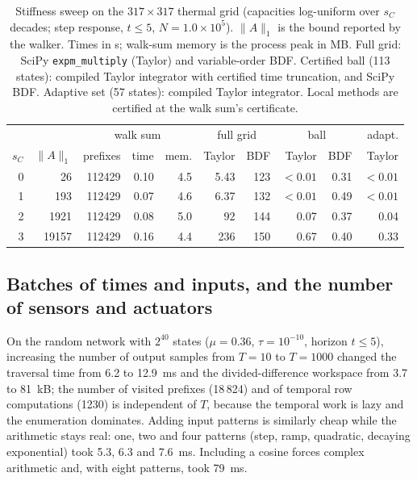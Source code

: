 \documentclass[aps,pra,superscriptaddress,floatfix,longbibliography,twocolumn]{revtex4-2}
\begin{document}
\begin{table}[t]
\footnotesize\setlength{\tabcolsep}{1.8pt}
\caption{Stiffness sweep on the $317\times317$ thermal grid (capacities log-uniform over $s_C$ decades; step response, $t\le5$, $N=1.0\times10^5$). $\|A\|_1$ is the bound reported by the walker. Times in s; walk-sum memory is the process peak in MB. Full grid: SciPy \texttt{expm\_multiply} (Taylor) and variable-order BDF. Certified ball (113 states): compiled Taylor integrator with certified time truncation, and SciPy BDF. Adaptive set (57 states): compiled Taylor integrator. Local methods are certified at the walk sum's certificate.}\label{tab:stiff}
\begin{ruledtabular}
\begin{tabular}{rr|rrr|rr|rr|r}
 & & \multicolumn{3}{c|}{walk sum} & \multicolumn{2}{c|}{full grid} & \multicolumn{2}{c|}{ball} & adapt.\\
$s_C$ & $\|A\|_1$ & prefixes & time & mem. & Taylor & BDF & Taylor & BDF & Taylor\\\hline
0 & 26 & 112429 & 0.10 & 4.5 & 5.43 & 123 & $<0.01$ & 0.31 & $<0.01$ \\
1 & 193 & 112429 & 0.07 & 4.6 & 6.37 & 132 & $<0.01$ & 0.49 & $<0.01$ \\
2 & 1921 & 112429 & 0.08 & 5.0 & 92 & 144 & 0.07 & 0.37 & 0.04 \\
3 & 19157 & 112429 & 0.16 & 4.4 & 236 & 150 & 0.67 & 0.40 & 0.33 \\
\end{tabular}
\end{ruledtabular}
\end{table}

\subsection{Batches of times and inputs, and the number of sensors and actuators}\label{sec:batch}
On the random network with $2^{40}$ states ($\mu=0.36$, $\tau=10^{-10}$, horizon $t\le5$), increasing the number of output samples from $T=10$ to $T=1000$ changed the traversal time from 6.2 to 12.9~ms and the divided-difference workspace from 3.7 to 81~kB; the number of visited prefixes (18\,824) and of temporal row computations (1230) is independent of $T$, because the temporal work is lazy and the enumeration dominates. Adding input patterns is similarly cheap while the arithmetic stays real: one, two and four patterns (step, ramp, quadratic, decaying exponential) took 5.3, 6.3 and 7.6~ms. Including a cosine forces complex arithmetic and, with eight patterns, took 79~ms.
\end{document}
